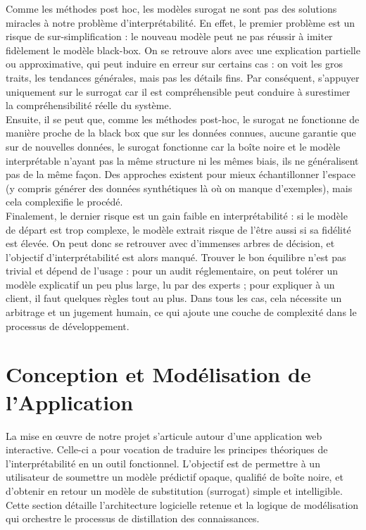\documentclass{article}
\begin{document}
    \quad Comme les méthodes post hoc, les modèles surogat ne sont pas des solutions miracles à notre problème d'interprétabilité. En effet, le premier problème est un risque de sur-simplification : le nouveau modèle peut ne pas réussir à imiter fidèlement le modèle black-box. On se retrouve alors avec une explication partielle ou approximative, qui peut induire en erreur sur certains cas : on voit les gros traits, les tendances générales, mais pas les détails fins. Par conséquent, s’appuyer uniquement sur le surrogat car il est compréhensible peut conduire à surestimer la compréhensibilité réelle du système.\\
    
    Ensuite, il se peut que, comme les méthodes post-hoc, le surogat ne fonctionne de manière proche de la black box que sur les données connues, aucune garantie que sur de nouvelles données, le surogat fonctionne car la boîte noire et le modèle interprétable n’ayant pas la même structure ni les mêmes biais, ils ne généralisent pas de la même façon. Des approches existent pour mieux échantillonner l’espace (y compris générer des données synthétiques là où on manque d’exemples), mais cela complexifie le procédé.\\
    
    Finalement, le dernier risque est un gain faible en interprétabilité : si le modèle de départ est trop complexe, le modèle extrait risque de l’être aussi si sa fidélité est élevée. On peut donc se retrouver avec d’immenses arbres de décision, et l’objectif d’interprétabilité est alors manqué. Trouver le bon équilibre n’est pas trivial et dépend de l’usage : pour un audit réglementaire, on peut tolérer un modèle explicatif un peu plus large, lu par des experts ; pour expliquer à un client, il faut quelques règles tout au plus. Dans tous les cas, cela nécessite un arbitrage et un jugement humain, ce qui ajoute une couche de complexité dans le processus de développement.


\clearpage
\section{Conception et Modélisation de l'Application}

\quad La mise en œuvre de notre projet s'articule autour d'une application web interactive. Celle-ci a pour vocation de traduire les principes théoriques de l'interprétabilité en un outil fonctionnel. L'objectif est de permettre à un utilisateur de soumettre un modèle prédictif opaque, qualifié de boîte noire, et d'obtenir en retour un modèle de substitution (surrogat) simple et intelligible. Cette section détaille l'architecture logicielle retenue et la logique de modélisation qui orchestre le processus de distillation des connaissances.
\end{document}
